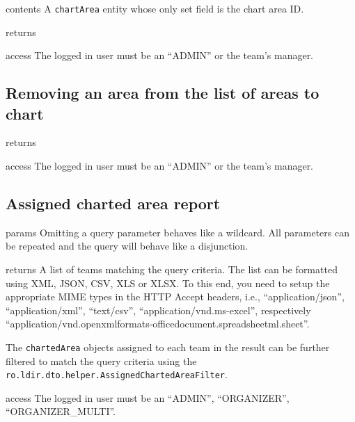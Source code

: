 \begin{apidata}{contents}
  A \texttt{chartArea} entity whose only set field is the chart area ID.
\end{apidata}
\begin{apidata}{returns}
  \begin{datalist}
  \end{datalist}
\end{apidata}
\begin{apidata}{access}
The logged in user must be an ``ADMIN'' or the team's manager.
\end{apidata}


\subsection{Removing an area from the list of areas to chart}

\begin{apidata}{returns}
  \begin{datalist}
  \end{datalist}
\end{apidata}
\begin{apidata}{access}
The logged in user must be an ``ADMIN'' or the team's manager.
\end{apidata}

\subsection{Assigned charted area report}

\begin{apidata}{params}
  Omitting a query parameter behaves like a wildcard. All parameters can be
  repeated and the query will behave like a disjunction.
\end{apidata}
\begin{apidata}{returns}
  A list of teams matching the query criteria. The list can be formatted using
  XML, JSON, CSV, XLS or XLSX. To this end, you need to setup the appropriate
  MIME types in the HTTP Accept headers, i.e., ``application/json'',
  ``application/xml'', ``text/csv'', ``application/vnd.ms-excel'', respectively
  ``application/vnd.openxmlformats-officedocument.spreadsheetml.sheet''.

  The \texttt{chartedArea} objects assigned to each team in the result can be
  further filtered to match the query criteria using the
  \texttt{ro.ldir.dto.helper.AssignedChartedAreaFilter}. 
\end{apidata}
\begin{apidata}{access}
The logged in user must be an ``ADMIN'', ``ORGANIZER'', ``ORGANIZER\_MULTI''. 
\end{apidata}


